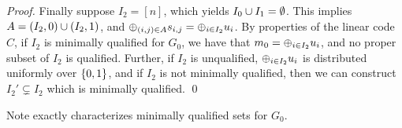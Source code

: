 \begin{proof}
	Finally suppose $I_2 = [n]$, which yields $I_0 \cup I_1 = \emptyset$.
	This implies $A = (I_2, 0) \cup (I_2, 1)$, and $\oplus_{(i,j)\in A}s_{i,j} = \oplus_{i \in I_2} u_i$.
	By properties of the linear code $C$, if $I_2$ is minimally qualified for $G_0$, we have that $m_0 = \oplus_{i \in I_2} u_i$, and no proper subset of $I_2$ is qualified.
	Further, if $I_2$ is unqualified, $\oplus_{i \in I_2} u_i$ is distributed uniformly over ${\{0,1\}}$, and if $I_2$ is not minimally qualified, then we can construct $I_2' \subsetneq I_2$ which is minimally qualified. \qed
\end{proof}
Note  exactly characterizes minimally qualified sets for $G_0$.
















